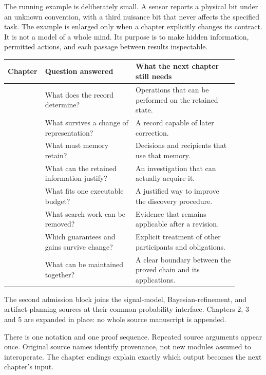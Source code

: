 \documentclass[11pt,oneside,openany]{book}
\theoremstyle{definition}\newtheorem{definition}[theorem]{Definition}
\begin{document}
The running example is deliberately small. A sensor reports a physical bit under an unknown convention, with a third nuisance bit that never affects the specified task. The example is enlarged only when a chapter explicitly changes its contract. It is not a model of a whole mind. Its purpose is to make hidden information, permitted actions, and each passage between results inspectable.

\begin{center}\begin{tabular}{>{\raggedright\arraybackslash}p{0.08\linewidth}>{\raggedright\arraybackslash}p{0.38\linewidth}>{\raggedright\arraybackslash}p{0.43\linewidth}}\toprule
Chapter & Question answered & What the next chapter still needs\\\midrule
1 & What does the record determine? & Operations that can be performed on the retained state.\\
2 & What survives a change of representation? & A record capable of later correction.\\
3 & What must memory retain? & Decisions and recipients that use that memory.\\
4 & What can the retained information justify? & An investigation that can actually acquire it.\\
5 & What fits one executable budget? & A justified way to improve the discovery procedure.\\
6 & What search work can be removed? & Evidence that remains applicable after a revision.\\
7 & Which guarantees and gains survive change? & Explicit treatment of other participants and obligations.\\
8 & What can be maintained together? & A clear boundary between the proved chain and its applications.\\\bottomrule
\end{tabular}\end{center}

The second admission block joins the signal-model, Bayesian-refinement, and artifact-planning sources at their common probability interface. Chapters 2, 3 and 5 are expanded in place: no whole source manuscript is appended.

There is one notation and one proof sequence. Repeated source arguments appear once. Original source names identify provenance, not new modules assumed to interoperate. The chapter endings explain exactly which output becomes the next chapter's input.
\end{document}
